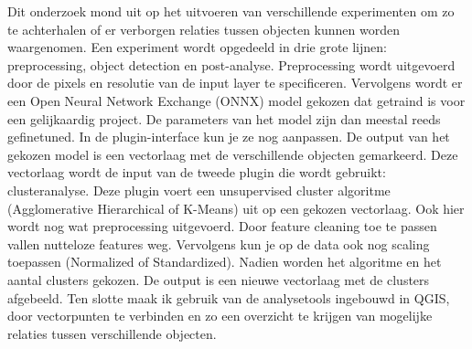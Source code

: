 




Dit onderzoek mond uit op het uitvoeren van verschillende experimenten om zo te achterhalen of er verborgen relaties tussen objecten kunnen 
worden waargenomen. Een experiment wordt opgedeeld in drie grote lijnen: preprocessing, object detection en post-analyse. 
Preprocessing wordt uitgevoerd door de pixels en resolutie van de input layer te specificeren. 
Vervolgens wordt er een Open Neural Network Exchange (ONNX) model gekozen dat getraind is voor een gelijkaardig project.
De parameters van het model zijn dan meestal reeds gefinetuned. In de plugin-interface kun je ze nog aanpassen.
De output van het gekozen model is een vectorlaag met de verschillende objecten gemarkeerd. 
Deze vectorlaag wordt de input van de tweede plugin die wordt gebruikt: clusteranalyse. Deze plugin voert een unsupervised cluster 
algoritme (Agglomerative Hierarchical of K-Means) uit op een gekozen vectorlaag. Ook hier wordt nog wat preprocessing uitgevoerd.
Door feature cleaning toe te passen vallen nutteloze features weg. Vervolgens kun je op de data ook nog scaling 
toepassen (Normalized of Standardized). Nadien worden het algoritme en het aantal clusters gekozen.
De output is een nieuwe vectorlaag met de clusters afgebeeld. Ten slotte maak ik gebruik van de analysetools ingebouwd in QGIS, 
door vectorpunten te verbinden en zo een overzicht te krijgen van mogelijke relaties tussen verschillende objecten.

